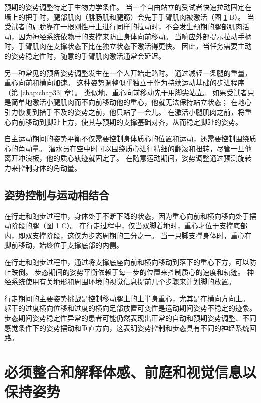 \begin{figure}[htbp]
	\label{fig:36_8}
\end{figure}

预期的姿势调整特定于生物力学条件。
当一个自由站立的受试者快速拉动固定在墙上的把手时，腿部肌肉（腓肠肌和腿筋）会先于手臂肌肉被激活（图 \ref{fig:36_8} B）。
当受试者的肩膀靠在一根刚性杆上进行同样的拉动时，不会发生预期的腿部肌肉活动，因为神经系统依赖杆的支撑来防止身体向前移动。
当响应外部提示拉动手柄时，手臂肌肉在支撑状态下比在独立状态下激活得更快。
因此，当任务需要主动的姿势稳定性时，随意的手臂肌肉激活通常会延迟。


另一种常见的预备姿势调整发生在一个人开始走路时。
通过减轻一条腿的重量，重心向前和横向加速。
这种姿势调整似乎独立于作为持续运动基础的步进程序（第 \ref{chap:chap33} 章）。
类似地，重心向前移动先于用脚尖站立。
如果受试者只是简单地激活小腿肌肉而不向前移动他的重心，他就无法保持站立状态；
在地心引力恢复到措手不及的姿势之前，他只站了一会儿。
在激活小腿肌肉之前，将重心向前移动到脚趾上方，使其与预期的支撑基础对齐，从而稳定脚趾的姿势。


自主运动期间的姿势平衡不仅需要控制身体质心的位置和运动，还需要控制围绕质心的角动量。
潜水员在空中时可以围绕质心进行精细的翻滚和扭转，尽管一旦他离开冲浪板，他的质心轨迹就固定了。
在随意运动期间，姿势调整通过预测旋转力来控制身体的角动量。


\subsection{姿势控制与运动相结合}

在行走和跑步过程中，身体处于不断下降的状态，因为重心向前和横向移向处于摆动阶段的腿（图 \ref{fig:36_8} C）。
在行走过程中，仅当双脚着地时，重心才位于支撑底部内，即双支撑阶段，这仅为步态周期的三分之一。
当一只脚支撑身体时，重心在脚前移动，始终位于支撑底部的内侧。


在行走和跑步过程中，通过将支撑底座向前和横向移动到落下的重心下方，可以防止跌倒。
步态期间的姿势平衡依赖于每一步的位置来控制质心的速度和轨迹。
神经系统使用有关地形和周围环境的视觉信息提前几个步骤来计划脚的放置。


行走期间的主要姿势挑战是控制移动腿上的上半身重心，尤其是在横向方向上。
躯干的过度横向位移和过度的横向足部放置可变性是运动期间姿势不稳定的迹象。
步态期间姿势稳定性异常的患者可能仍然表现出正常的自动和预期姿势调整、不同感觉条件下的姿势摆动和垂直方向，这表明姿势控制和步态具有不同的神经系统回路。



\section{必须整合和解释体感、前庭和视觉信息以保持姿势}

